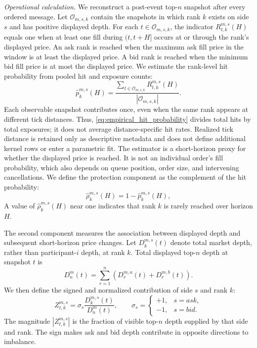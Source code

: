 \documentclass[11pt]{article}
\begin{document}
\emph{Operational calculation.} We reconstruct a post-event top-$n$ snapshot after every ordered message. Let
$\mathcal{O}_{m,s,k}$ contain the snapshots in which rank $k$ exists on side $s$ and has positive displayed depth. For
each $t\in\mathcal{O}_{m,s,k}$, the indicator $R^{m,s}_{t,k}(H)$ equals one when at least one fill during $(t,t+H]$ occurs
at or through the rank's displayed price. An ask rank is reached when the maximum ask fill price in the window is at least
the displayed price. A bid rank is reached when the minimum bid fill price is at most the displayed price. We estimate the
rank-level hit probability from pooled hit and exposure counts:
\begin{equation}
    \widehat p^{m,s}_{k}(H)
    =
    \frac{
        \sum_{t\in\mathcal{O}_{m,s,k}}R^{m,s}_{t,k}(H)
    }{
        |\mathcal{O}_{m,s,k}|
    }.
    \label{eq:empirical_hit_probability}
\end{equation}
Each observable snapshot contributes once, even when the same rank appears at different tick distances. Thus,
\cref{eq:empirical_hit_probability} divides total hits by total exposures; it does not average distance-specific hit
rates. Realized tick distance is retained only as descriptive metadata and does not define additional kernel rows or enter
a parametric fit. The estimator is a short-horizon proxy for whether the displayed price is reached. It is not an
individual order's fill probability, which also depends on queue position, order size, and intervening cancellations.
We define the protection component as the complement of the hit probability:
\begin{equation}
    \widehat\rho^{m,s}_{k}(H)=1-\widehat p^{m,s}_{k}(H),
    \label{eq:empirical_protection_profile}
\end{equation}
A value of $\widehat\rho^{m,s}_{k}(H)$ near one indicates that rank $k$ is rarely reached over horizon $H$.

The second component measures the association between displayed depth and subsequent short-horizon price changes. Let
$D^{m,s}_{k}(t)$ denote total market depth, rather than participant-$i$ depth, at rank $k$. Total displayed top-$n$ depth
at snapshot $t$ is
\begin{equation}
    D^{m}_{n}(t)
    =
    \sum_{r=1}^{n}\left(D^{m,a}_{r}(t)+D^{m,b}_{r}(t)\right).
    \label{eq:total_topn_market_depth}
\end{equation}
We then define the signed and normalized contribution of side $s$ and rank $k$:
\begin{equation}
    Z^{m,s}_{t,k}
    =
    \sigma_s\frac{D^{m,s}_{k}(t)}{D^{m}_{n}(t)},
    \qquad
    \sigma_s= \begin{cases}
        +1, & s=ask,\\
        -1, & s=bid.
    \end{cases}
    \label{eq:normalized_level_contribution}
\end{equation}
The magnitude $|Z^{m,s}_{t,k}|$ is the fraction of visible top-$n$ depth supplied by that side and rank. The sign makes ask
and bid depth contribute in opposite directions to imbalance.
\end{document}
